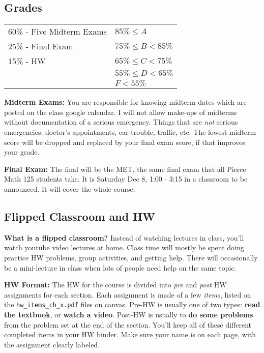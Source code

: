 \documentclass[12pt, twoside]{article}
\begin{document}
\subsection*{Grades}

   \begin{center}
      \begin{tabular}{l | l}
         60\% - Five Midterm Exams & $85\% \le A$ \\
         25\% - Final Exam         & $75\% \le B < 85\%$ \\
         15\% - HW                 & $65\% \le C < 75\%$ \\
                                   & $55\% \le D < 65\%$ \\
                                   & \hspace{3.5em}$F < 55\%$
      \end{tabular}
   \end{center}
   
   \noindent   \textbf{Midterm Exams:} You are responsible for knowing midterm dates which are posted on the class google calendar. I will not allow make-ups of midterms without documentation of a serious emergency. Things that are \emph{not} serious emergencies: doctor's appointments, car trouble, traffic, etc. The lowest midterm score will be dropped and replaced by your final exam score, if that improves your grade.
      
   \noindent \textbf{Final Exam:} The final will be the MET, the same final exam that all Pierce Math 125 students take. It is Saturday Dec 8, 1:00 - 3:15  in a classroom to be announced. It will cover the whole course.

\newpage

\subsection*{Flipped Classroom and HW}
   \textbf{What is a flipped classroom?} Instead of watching lectures in class, you'll watch youtube video lectures at home. Class time will mostly be spent doing practice HW problems, group activities, and getting help. There will occasionally be a mini-lecture in class when lots of people need help on the same topic.
   
   \noindent\textbf{HW Format:}  The HW for the course is divided into \emph{pre} and \emph{post} HW assignments for each section. Each assignment is made of a few \emph{items}, listed on the \texttt{hw\_items\_ch\_x.pdf} files on canvas. Pre-HW is usually one of two types: \textbf{read the textbook}, or \textbf{watch a video}. Post-HW is usually to \textbf{do some problems} from the problem set at the end of the section. You'll keep all of these different completed items in your HW binder. Make sure your name is on each page, with the assignment clearly labeled.
   
\end{document}
